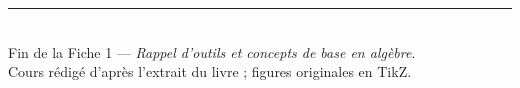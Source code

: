 \documentclass[11pt,a4paper]{article}
\begin{document}
\vfill
\begin{center}
\small\color{black!55}
\rule{0.5\textwidth}{0.4pt}\\[4pt]
Fin de la Fiche 1 — \emph{Rappel d'outils et concepts de base en algèbre}.\\
Cours rédigé d'après l'extrait du livre ; figures originales en TikZ.
\end{center}
\end{document}
